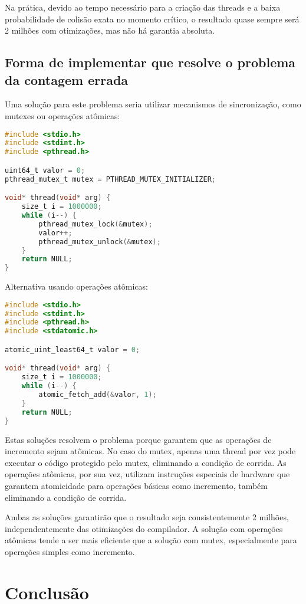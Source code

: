 \documentclass[12pt]{article}
\begin{document}
Na prática, devido ao tempo necessário para a criação das threads e a baixa probabilidade de colisão exata no momento crítico, o resultado quase sempre será 2 milhões com otimizações, mas não há garantia absoluta.

\subsection{Forma de implementar que resolve o problema da contagem errada}

Uma solução para este problema seria utilizar mecanismos de sincronização, como mutexes ou operações atômicas:

\begin{lstlisting}[language=C]
#include <stdio.h>
#include <stdint.h>
#include <pthread.h>

uint64_t valor = 0;
pthread_mutex_t mutex = PTHREAD_MUTEX_INITIALIZER;

void* thread(void* arg) {
    size_t i = 1000000;
    while (i--) {
        pthread_mutex_lock(&mutex);
        valor++;
        pthread_mutex_unlock(&mutex);
    }
    return NULL;
}
\end{lstlisting}

Alternativa usando operações atômicas:

\begin{lstlisting}[language=C]
#include <stdio.h>
#include <stdint.h>
#include <pthread.h>
#include <stdatomic.h>

atomic_uint_least64_t valor = 0;

void* thread(void* arg) {
    size_t i = 1000000;
    while (i--) {
        atomic_fetch_add(&valor, 1);
    }
    return NULL;
}
\end{lstlisting}

Estas soluções resolvem o problema porque garantem que as operações de incremento sejam atômicas. No caso do mutex, apenas uma thread por vez pode executar o código protegido pelo mutex, eliminando a condição de corrida. As operações atômicas, por sua vez, utilizam instruções especiais de hardware que garantem atomicidade para operações básicas como incremento, também eliminando a condição de corrida.

Ambas as soluções garantirão que o resultado seja consistentemente 2 milhões, independentemente das otimizações do compilador. A solução com operações atômicas tende a ser mais eficiente que a solução com mutex, especialmente para operações simples como incremento.

\section{Conclusão}
\end{document}
